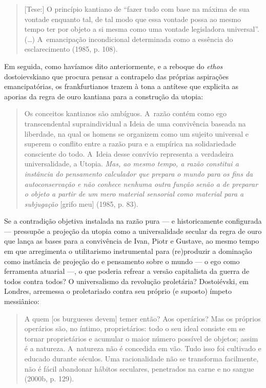 \begin{quote}
{[}Tese:{]} O princípio kantiano de ``fazer tudo com base na máxima de
sua vontade enquanto tal, de tal modo que essa vontade possa ao mesmo
tempo ter por objeto a si mesma como uma vontade legisladora
universal''. (\ldots) A~emancipação incondicional determinada como a
essência do esclarecimento (1985, p. 108).
\end{quote}

Em seguida, como havíamos dito anteriormente, e a reboque do
\emph{ethos} dostoievskiano que procura pensar a contrapelo das próprias
aspirações emancipatórias, os frankfurtianos trazem à tona a antítese
que explicita as aporias da regra de ouro kantiana para a construção da
utopia:

\begin{quote}
Os conceitos kantianos são ambíguos. A~razão contém como ego
transcendental supraindividual a Ideia de uma convivência baseada na
liberdade, na qual os homens se organizem como um sujeito universal e
superem o conflito entre a razão pura e a empírica na solidariedade
consciente do todo. A~Ideia desse convívio representa a verdadeira
universalidade, a Utopia. \emph{Mas, ao mesmo tempo, a razão constitui a
instância do pensamento calculador que prepara o mundo para os fins da
autoconservação e não conhece nenhuma outra função senão a de preparar o
objeto a partir de um mero material sensorial como material para a
subjugação} {[}grifo meu{]} (1985, p. 83).
\end{quote}

Se a contradição objetiva instalada na razão pura --- e historicamente
configurada --- pressupõe a projeção da utopia como a universalidade
secular da regra de ouro que lança as bases para a convivência de Ivan,
Piotr e Gustave, ao mesmo tempo em que arregimenta o utilitarismo
instrumental para (re)produzir a dominação como instância de projeção do
e pensamento sobre o mundo --- o ego como ferramenta atuarial ---, o que
poderia refrear a versão capitalista da guerra de todos contra todos? O
universalismo da revolução proletária? Dostoiévski, em Londres,
arremessa o proletariado contra seu próprio (e suposto) ímpeto
messiânico:

\begin{quote}
A quem {[}os burgueses devem{]} temer então? Aos operários? Mas os
próprios operários são, no íntimo, proprietários: todo o seu ideal
consiste em se tornar proprietários e acumular o maior número possível
de objetos; assim é a natureza. A~natureza não é concedida em vão. Tudo
isso foi cultivado e educado durante séculos. Uma racionalidade não se
transforma facilmente, não é fácil abandonar hábitos seculares,
penetrados na carne e no sangue (2000b, p. 129).
\end{quote}

